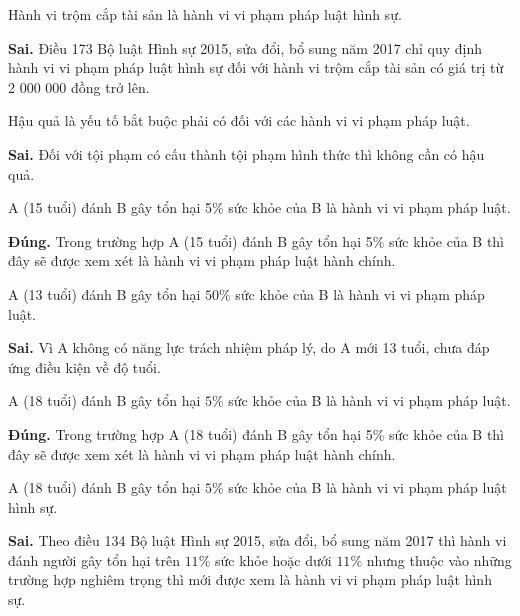 \begin{ques}
Hành vi trộm cắp tài sản là hành vi vi phạm pháp luật hình sự.
\end{ques}
\begin{ans}
\textbf{Sai.} Điều 173 Bộ luật Hình sự 2015, sửa đổi, bổ sung năm 2017 chỉ quy định hành vi vi phạm pháp luật hình sự đối với hành vi trộm cắp tài sản có giá trị từ 2 000 000 đồng trở lên.
\end{ans}

\begin{ques}
Hậu quả là yếu tố bắt buộc phải có đối với các hành vi vi phạm pháp luật.
\end{ques}
\begin{ans}
\textbf{Sai.} Đối với tội phạm có cấu thành tội phạm hình thức thì không cần có hậu quả.
\end{ans}

\begin{ques}
A (15 tuổi) đánh B gây tổn hại 5$\%$ sức khỏe của B là hành vi vi phạm pháp luật.
\end{ques}
\begin{ans}
\textbf{Đúng.} Trong trường hợp A (15 tuổi) đánh B gây tổn hại 5$\%$ sức khỏe của B thì đây sẽ được xem xét là hành vi vi phạm pháp luật hành chính.
\end{ans}

\begin{ques}
A (13 tuổi) đánh B gây tổn hại $50\%$ sức khỏe của B là hành vi vi phạm pháp luật.
\end{ques}
\begin{ans}
\textbf{Sai.} Vì A không có năng lực trách nhiệm pháp lý, do A mới 13 tuổi, chưa đáp ứng điều kiện về độ tuổi.
\end{ans}

\begin{ques}
A (18 tuổi) đánh B gây tổn hại $5\%$ sức khỏe của B là hành vi vi phạm pháp luật.
\end{ques}
\begin{ans}
\textbf{Đúng.} Trong trường hợp A (18 tuổi) đánh B gây tổn hại 5$\%$ sức khỏe của B thì đây sẽ được xem xét là hành vi vi phạm pháp luật hành chính.
\end{ans}

\begin{ques}
A (18 tuổi) đánh B gây tổn hại $5\%$ sức khỏe của B là hành vi vi phạm pháp luật hình sự.
\end{ques}
\begin{ans}
\textbf{Sai.} Theo điều 134 Bộ luật Hình sự 2015, sửa đổi, bổ sung năm 2017 thì hành vi đánh người gây tổn hại trên $11\%$ sức khỏe hoặc dưới $11\%$ nhưng thuộc vào những trường hợp nghiêm trọng thì mới được xem là hành vi vi phạm pháp luật hình sự.
\end{ans}

